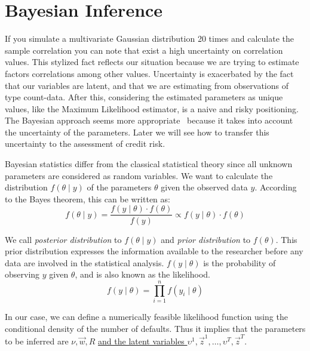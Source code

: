 \documentclass[11pt,fleqn]{book} %
\begin{document}
\section{Bayesian Inference}

If you simulate a multivariate Gaussian distribution 20 times and calculate the
sample correlation you can note that exist a high uncertainty on correlation 
values. This stylized fact reflects our situation because we are trying to 
estimate factors correlations among other values. Uncertainty is exacerbated 
by the fact that our variables are latent, and that we are estimating from 
observations of type count-data. After this, considering the estimated 
parameters as unique values, like the Maximum Likelihood estimator, is a 
naive and risky positioning. The Bayesian approach seems  more 
appropriate~\cite{gossl:2005,tarashev:2010} because it takes into account 
the uncertainty of the parameters. Later we will see how to transfer this 
uncertainty to the assessment of credit risk.

Bayesian statistics differ from the classical statistical theory since all 
unknown parameters are considered as random variables. We want to calculate 
the distribution $f(\theta \mid y)$ of the parameters $\theta$ given the 
observed data $y$. According to the Bayes theorem, this can be written as:
\begin{displaymath}
	f(\theta \mid y) = \frac{f(y \mid \theta) \cdot f(\theta)}{f(y)} \propto f(y \mid \theta) \cdot f(\theta)
\end{displaymath}

We call \emph{posterior distribution} to $f(\theta \mid y)$ and 
\emph{prior distribution} to $f(\theta)$. This prior distribution 
expresses the information available to the researcher before 
any data are involved in the statistical analysis. $f(y \mid \theta)$ 
is the probability of observing $y$ given $\theta$, and is also 
known as the likelihood.
\begin{displaymath}
	f(y \mid \theta) = \prod_{i=1}^n f(y_i \mid \theta)
\end{displaymath}

In our case, we can define a numerically feasible likelihood function using 
the conditional density of the number of defaults. Thus it implies that the 
parameters to be inferred are $\nu,\vec{w},R$ \ul{and the latent variables 
$\upsilon^1,\vec{z}^1,\dots,\upsilon^T,\vec{z}^T$}.
\end{document}
